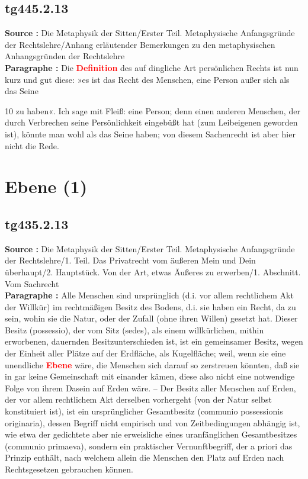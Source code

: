 \documentclass[a4paper,12pt,twoside]{book}
\newcommand{\match}[1]{\textcolor{red}{\textbf{#1}}}
\newcommand{\unnumberedsection}[1]{
	\section*{#1}
	\addcontentsline{toc}{section}{#1}
	\markright{#1}
}
\begin{document}
	\subsection*{tg445.2.13} 
	\textbf{Source : }Die Metaphysik der Sitten/Erster Teil. Metaphysische Anfangsgründe der Rechtslehre/Anhang erläutender Bemerkungen zu den metaphysischen Anhangsgründen der Rechtslehre\\  
	
	\textbf{Paragraphe : }Die \match{Definition} des auf dingliche Art persönlichen Rechts ist nun kurz und gut diese: »es ist das Recht des Menschen, eine Person außer sich als das Seine
	
	
	
	10
	zu haben«. Ich sage mit Fleiß: eine Person; denn einen anderen Menschen, der durch Verbrechen seine Persönlichkeit eingebüßt hat (zum Leibeigenen geworden ist), könnte man wohl als das Seine haben; von diesem Sachenrecht ist aber hier nicht die Rede. 
	
	\unnumberedsection{Ebene (1)} 
	\subsection*{tg435.2.13} 
	\textbf{Source : }Die Metaphysik der Sitten/Erster Teil. Metaphysische Anfangsgründe der Rechtslehre/1. Teil. Das Privatrecht vom äußeren Mein und Dein überhaupt/2. Hauptstück. Von der Art, etwas Äußeres zu erwerben/1. Abschnitt. Vom Sachrecht\\  
	
	\textbf{Paragraphe : }
	Alle Menschen sind ursprünglich (d.i. vor allem rechtlichem Akt der Willkür) im rechtmäßigen Besitz des Bodens, d.i. sie haben ein Recht, da zu sein, wohin sie die Natur, oder der Zufall (ohne ihren Willen) gesetzt hat. Dieser Besitz (possessio), der vom Sitz (sedes), als einem willkürlichen, mithin erworbenen, dauernden Besitzunterschieden ist, ist ein gemeinsamer Besitz, wegen der Einheit aller Plätze auf der Erdfläche, als Kugelfläche; weil, wenn sie eine unendliche \match{Ebene} wäre, die Menschen sich darauf so zerstreuen könnten, daß sie in gar keine Gemeinschaft mit einander kämen, diese also nicht eine notwendige Folge von ihrem Dasein auf Erden wäre. – Der Besitz aller Menschen auf Erden, der vor allem rechtlichem Akt derselben vorhergeht (von der Natur selbst konstituiert ist), ist ein ursprünglicher Gesamtbesitz (communio possessionis originaria), dessen Begriff nicht empirisch und von Zeitbedingungen abhängig ist, wie etwa der gedichtete aber nie erweisliche eines uranfänglichen Gesamtbesitzes (communio primaeva), sondern ein praktischer Vernunftbegriff, der a priori das Prinzip enthält, nach welchem allein die Menschen den Platz auf Erden nach Rechtsgesetzen gebrauchen können. 
	
\end{document}
